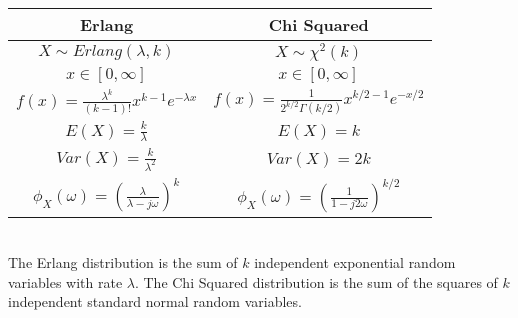 \documentclass[9.5pt]{article}
\begin{document}
\begin{tabular}{ | c| c |}
    Erlang & Chi Squared\\
    \hline
    $X\sim Erlang(\lambda,k)$ & $X\sim \chi^2(k)$\\
    $x\in [0,\infty]$ & $x\in [0,\infty]$\\
    $f(x)=\frac{\lambda^k}{(k-1)!}x^{k-1}e^{-\lambda x}$ & $f(x)=\frac{1}{2^{k/2}\Gamma(k/2)}x^{k/2-1}e^{-x/2}$\\
    $E(X)=\frac{k}{\lambda}$ & $E(X)=k$\\
    $Var(X)=\frac{k}{\lambda^2}$ & $Var(X)=2k$\\
    $\phi_X(\omega)=\left(\frac{\lambda}{\lambda-j\omega}\right)^k$ & $\phi_X(\omega)=\left(\frac{1}{1-j2\omega}\right)^{k/2}$\\
    \hline
\end{tabular}\\
The Erlang distribution is the sum of
$k$ independent exponential random variables with rate $\lambda$.
The Chi Squared distribution is the sum of the squares of $k$ independent standard normal random variables.
\end{document}
